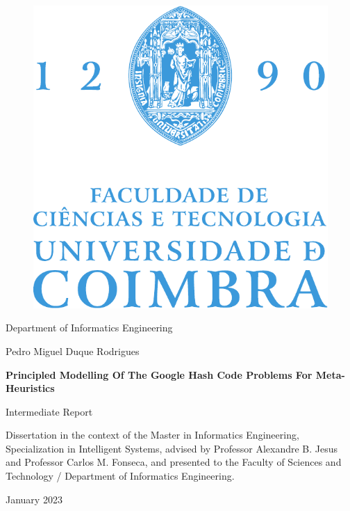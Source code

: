 \thispagestyle{empty}

\mbox{}
\vspace{0.5cm}

\begin{center}

    \begin{figure}[h!]
        \centering
        \includegraphics[width=0.35\linewidth, keepaspectratio]{../assets/logos/fctuc-logo.pdf}
    \end{figure}

    \normalsize{\textsf{Department of Informatics Engineering}}

    \vspace{1.5cm}

    \Large{\textsf{Pedro Miguel Duque Rodrigues}}

    \vspace{2cm}

    \Huge{\textbf{\textsf{Principled Modelling Of The Google Hash Code Problems For Meta-Heuristics}}}

    \LARGE{\textsf{Intermediate Report}}

    \vspace{3cm}

    \begin{center}
        \normalsize{
            \textsf{
                Dissertation in the context of the Master in Informatics Engineering, Specialization in Intelligent Systems, advised by Professor Alexandre
                B. Jesus and Professor Carlos M. Fonseca, and presented to the Faculty
                of Sciences and Technology / Department of Informatics Engineering.
            }
        }
    \end{center}

    \vspace{1.5cm}

    \normalsize{\textsf{January 2023}}

\end{center}

